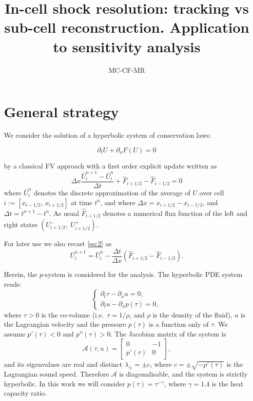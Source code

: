 \documentclass[10pt]{article}
\title{In-cell shock resolution: tracking vs sub-cell reconstruction. Application to sensitivity analysis}
\author{MC-CF-MR}
\begin{document}
\maketitle
\tableofcontents


\section{General strategy}

We consider the solution of a hyperbolic system of conservation laws: 

\begin{equation}\label{eq:1}
\partial_tU+ \partial_x F(U) =0
\end{equation}

by a classical FV approach with a first order explicit update written as
\begin{equation}\label{eq:2}
\Delta x\dfrac{\bar U^{n+1}_i-\bar U^{n}_i}{\Delta t}+ \hat F_{i+1/2}  -  \hat F_{i-1/2} =0
\end{equation}
where   $\bar U_i^n$ denotes  the discrete approximation of the average of $U$ over cell $i:=[x_{i-1/2},\,x_{i+1/2}]$ at time $t^n$,
and where $\Delta x =x_{i+1/2}-x_{i-1/2}$, and $\Delta t=t^{n+1}-t^n$.
As usual $\hat F_{i+1/2} $ denotes a numerical flux function of the left and right states $(U_{i+1/2}^-,\;U_{i+1/2}^+)$.

For later use we also recast  \eqref{eq:2} as
\begin{equation}\label{eq:3}
\bar U^{n+1}_i = \bar U^{n}_i - \dfrac{\Delta t}{\Delta x}\left(\hat F_{i+1/2}  -  \hat F_{i-1/2}\right).
\end{equation}
 
Herein, the $p$-system is considered for the analysis.
The hyperbolic PDE system reads:
\begin{equation} 
\begin{cases}
\partial_t \tau - \partial_x u = 0,\\
\partial_t u - \partial_x p(\tau) = 0,
\end{cases} 
\end{equation}
where $\tau>0$ is the co-volume (i.e.\ $\tau=1/\rho$, and $\rho$ is the density of the fluid), $u$ is the 
Lagrangian velocity and the pressure $p(\tau)$ is a function only of $\tau$. 
We assume $p'(\tau)<0$ and $p''(\tau)>0$.
The Jacobian matrix of the system is
\begin{equation}
\mathcal{A}(\tau,u) = \begin{bmatrix} 0 & -1 \\ p'(\tau) & 0 \end{bmatrix}, 
\end{equation}
and its eigenvalues are real and distinct $\lambda_{\pm}=\pm c$, where $c=\pm\sqrt{-p'(\tau)}$ is the Lagrangian sound speed. 
Therefore $\mathcal{A}$ is diagonalisable, and the system is strictly hyperbolic. 
In this work we will consider $p(\tau) = \tau^{-\gamma}$, where $\gamma = 1.4$ is the heat capacity ratio.
\end{document}
